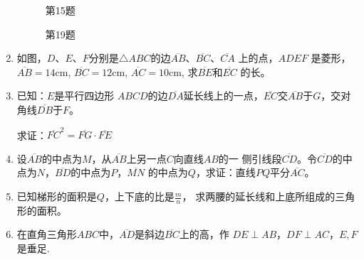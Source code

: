 \begin{enumerate}
\begin{figure}
    \begin{minipage}[t]{0.48\linewidth}
    \centering
\begin{tikzpicture}[>=latex, scale=1]
    \end{tikzpicture}
    \caption*{第15题}
    \end{minipage}
    \begin{minipage}[t]{0.48\linewidth}
    \centering
    \begin{tikzpicture}[>=latex, scale=1]
    \end{tikzpicture}
    \caption*{第19题}
    \end{minipage}
    \end{figure}

\item 如图，$D$、$E$、$F$分别是$\triangle ABC$的边$\overline{AB}$、$\overline{BC}$、$\overline{CA}$
上的点，$ADEF$
是菱形，$\overline{AB}=14$cm, $\overline{BC}=12$cm, $\overline{AC}=10$cm, 求$\overline{BE}$和$\overline{EC}$
的长。

\item 已知：$E$是平行四边形
$ABCD$的边$\overline{DA}$延长线上的一点，$\overline{EC}$交$\overline{AB}$于$G$，交对角线$\overline{DB}$于$F$。

求证：$\overline{FC}^2=\overline{FG}\cdot \overline{FE}$
\item 设$\overline{AB}$的中点为$M$，从$\overline{AB}$上另一点$C$向直线$AB$的一
侧引线段$\overline{CD}$。令$\overline{CD}$的中点为$N$，$\overline{BD}$的中点为$P$，$\overline{MN}$
的中点为$Q$，求证：直线$PQ$平分$\overline{AC}$。
\item 已知梯形的面积是$Q$，上下底的比是$\frac{m}{n}$，
求两腰的延长线和上底所组成的三角形的面积。
\item 在直角三角形$ABC$中，$\overline{AD}$是斜边$\overline{BC}$上的高，作
$DE\perp AB$，$DF\perp AC$，$E,F$是垂足.


\end{enumerate}
